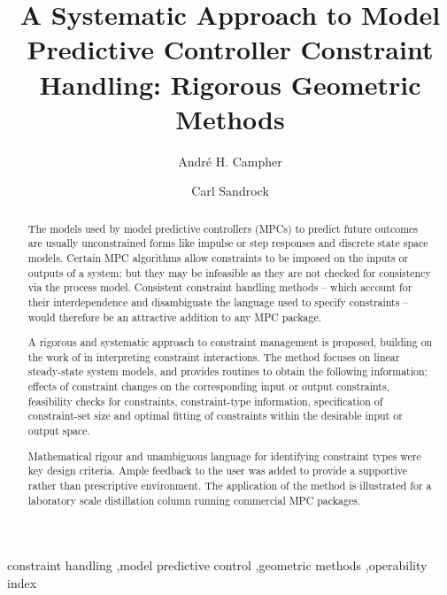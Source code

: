 \documentclass[final,authoryear,5pt,times,twocolumn]{elsarticle}
\begin{document}
\begin{frontmatter}

\title{A Systematic Approach to Model Predictive Controller Constraint Handling: Rigorous Geometric Methods}

\author{Andr\'e H. Campher}

\author{Carl Sandrock}


\address{Department of Chemical Engineering, University of Pretoria, Pretoria 0001, South Africa}

\begin{abstract}
The models used by model predictive controllers (MPCs) to predict future outcomes are usually unconstrained forms like impulse or step responses and discrete state space models. 
Certain MPC algorithms allow constraints  to be imposed on the inputs or outputs of a system; but they may be infeasible as they are not checked for consistency via the process model. 
Consistent constraint handling methods -- which account for their interdependence and disambiguate the language used to specify constraints -- would therefore be an attractive addition to any MPC package.

A rigorous and systematic approach to constraint management is proposed, building on the work of \citet{vinsonartoi} in interpreting constraint interactions. 
The method focuses on linear steady-state system models, and provides routines to obtain the following information; effects of constraint changes on the corresponding input or output constraints, feasibility checks for constraints, constraint-type information, specification of constraint-set size and optimal fitting of constraints within the desirable input or output space.

Mathematical rigour and unambiguous language for identifying constraint types were key design criteria. 
Ample feedback to the user was added to provide a supportive rather than prescriptive environment.
The application of the method is illustrated for a laboratory scale distillation column running commercial MPC packages.
\end{abstract}

\begin{keyword}
constraint handling \sep model predictive control \sep geometric methods \sep operability index
\end{keyword}

\end{frontmatter}
\end{document}
